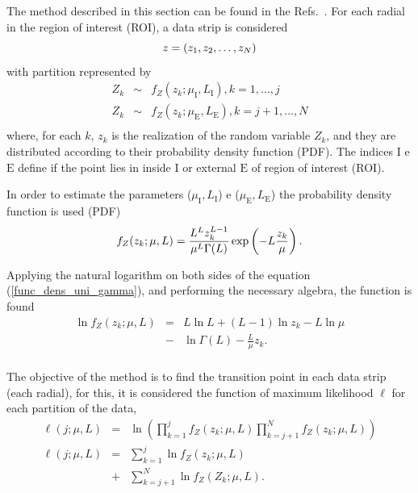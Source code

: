 \documentclass[conference]{IEEEtran}
\begin{document}
The method described in this section can be found in the Refs.~\cite{gmbf,nhfc}. For each radial in the region of interest (ROI), a data strip is considered
\begin{equation}\nonumber
	z = (z_1,z_2,\dots,z_N) \\
\end{equation}
with partition represented by
\begin{equation}\label{func_max_ver_uni_gamma} 
\begin{array}{lll}
	Z_k&\sim& f_Z(z_k;\mu_\text{I},L_\text{I}), k=1,\dots,j\\
	Z_k&\sim& f_Z(z_k;\mu_\text{E},L_\text{E}), k=j+1,\dots,N\\
\end{array}
\end{equation}
where, for each $k$, $z_k$ is the realization of the random variable $Z_k$, and they are distributed according to their probability density function (PDF). The indices $\text{I}$ e $\text{E}$ define if the point lies in inside $\text{I}$ or external $\text{E}$ of region of interest (ROI).

In order to estimate the parameters ($\mu_\text{I},L_\text{I}$) e ($\mu_\text{E},L_\text{E}$)  the probability density function is used (PDF)
\begin{equation}\label{func_dens_uni_gamma}
	f_Z(z_k;\mu,L)=\frac{L^{L}z_k^{L-1}}{\mu^{L}\Gamma(L)} \exp\left(-L\frac{z_k}{\mu}\right). \\
\end{equation}

Applying the natural logarithm on both sides of the equation (\ref{func_dens_uni_gamma}), and performing  the necessary algebra,  the function is found
\begin{equation}\label{func_max_ver_uni_gamma}
\begin{array}{lcl}
	\ln f_Z(z_k;\mu,L)&=& L\ln L +(L - 1) \ln z_k-L \ln \mu \\
	 	                  &-& \ln \Gamma(L) -\frac{L}{\mu} z_k.\\
\end{array}
\end{equation}

The objective of the method is to find the transition point in each data  strip (each radial), for this, it is considered the function of maximum likelihood $\ell$ for each partition of the data,
\begin{equation}\nonumber
\begin{array}{lcl}
 \ell(j;\mu, L)&=&\ln\left(\prod_{k=1}^{j}f_{Z}(z_k;\mu,L)\prod_{k=j+1}^{N}f_{Z}(z_k;\mu,L)\right)\\
 \ell(j;\mu, L)&=&\sum_{k=1}^{j}\ln f_{Z}(z_k;\mu,L)\\
             &+&\sum_{k=j+1}^{N}\ln f_{Z}(Z_k;\mu,L).
 \end{array}
 \end{equation}
 
\end{document}
